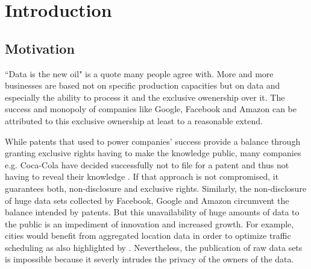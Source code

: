 
\chapter{Introduction}\label{chapter:introduction}
\section{Motivation}

“Data is the new oil"\parencite{data-is-the-new-oil, data-is-the-new-oil2} is a quote many people agree with. More and more businesses are based not on specific production capacities but on data and especially the ability to process it and the exclusive owenership over it. The success and monopoly of companies like Google, Facebook and Amazon can be attributed to this exclusive ownership at least to a reasonable extend.

While patents that used to power companies' success provide a balance through granting exclusive rights having to make the knowledge public, many companies e.g. Coca-Cola have decided successfully not to file for a patent and thus not having to reveal their knowledge \parencite{coca-cola}. If that approach is not compromised, it guarantees both, non-disclosure and  exclusive rights. Similarly, the non-disclosure of huge data sets collected by Facebook, Google and Amazon circumvent the balance intended by patents. But this unavailability of huge amounts of data to the public is an impediment of innovation and increased growth. For example, cities would benefit from aggregated location data in order to optimize traffic scheduling as also highlighted by \parencite{hoh2005protecting}.
Nevertheless, the publication of raw data sets is impossible because it severly intrudes the privacy of the owners of the data.

